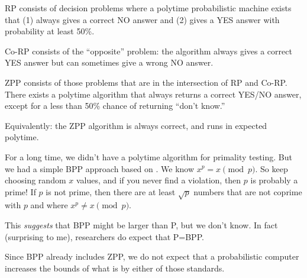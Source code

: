 \begin{remark}
  RP consists of decision problems where a polytime probabilistic
  machine exists that (1) always gives a correct NO answer and (2) gives
  a YES answer with probability at least 50\%.

  Co-RP consists of the ``opposite'' problem: the algorithm always gives
  a correct YES answer but can sometimes give a wrong NO answer.

  ZPP consists of those problems that are in the intersection of RP and
  Co-RP. There exists a polytime algorithm that always returns a correct
  YES/NO answer, except for a less than 50\% chance of returning ``don't
  know.''

  Equivalently: the ZPP algorithm is always correct, and runs in
  expected polytime.
\end{remark}

\begin{remark}
  For a long time, we didn't have a polytime algorithm for primality
  testing. But we had a simple BPP approach based on . We know $x^p = x \pmod{p}$. So keep choosing random $x$
  values, and if you never find a violation, then $p$ is probably a
  prime! If $p$ is not prime, then there are at least $\sqrt{p}$ numbers
  that are not coprime with $p$ and where $x^p \ne x \pmod{p}$.

  This \emph{suggests} that BPP might be larger than P, but we don't
  know. In fact (surprising to me), researchers do expect that P=BPP.

  Since BPP already includes ZPP, we do not expect that a probabilistic
  computer increases the bounds of what is  by either of those standards.
\end{remark}







